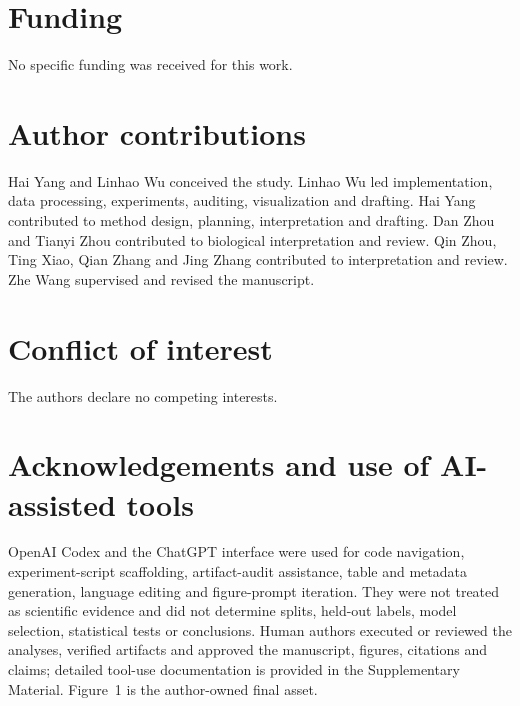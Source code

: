 \documentclass[unnumsec,webpdf,contemporary,large,numbered]{oup-authoring-template}
\begin{document}
\section{Funding}

No specific funding was received for this work.

\section{Author contributions}

Hai Yang and Linhao Wu conceived the study. Linhao Wu led implementation, data processing, experiments, auditing, visualization and drafting. Hai Yang contributed to method design, planning, interpretation and drafting. Dan Zhou and Tianyi Zhou contributed to biological interpretation and review. Qin Zhou, Ting Xiao, Qian Zhang and Jing Zhang contributed to interpretation and review. Zhe Wang supervised and revised the manuscript.

\section{Conflict of interest}

The authors declare no competing interests.

\section{Acknowledgements and use of AI-assisted tools}

OpenAI Codex and the ChatGPT interface were used for code navigation, experiment-script scaffolding, artifact-audit assistance, table and metadata generation, language editing and figure-prompt iteration. They were not treated as scientific evidence and did not determine splits, held-out labels, model selection, statistical tests or conclusions. Human authors executed or reviewed the analyses, verified artifacts and approved the manuscript, figures, citations and claims; detailed tool-use documentation is provided in the Supplementary Material. Figure~1 is the author-owned final asset.

\clearpage
{\footnotesize
\def\bibfont{\fontsize{6.6bp}{7.6bp}\selectfont}
\setlength{\bibsep}{0pt}


}
\end{document}
